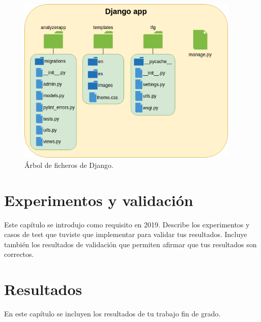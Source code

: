 \documentclass[a4paper, 12pt]{book}
\begin{document}
\begin{figure}
  \centering
  \includegraphics[height=8cm, keepaspectratio]{img/directorios.png}
  \caption{Árbol de ficheros de Django.}\label{fig:directorios}
\end{figure}




\cleardoublepage
\chapter{Experimentos y validación}

Este capítulo se introdujo como requisito en 2019. 
Describe los experimentos y casos de test que tuviste que implementar para validar tus resultados. 
Incluye también los resultados de validación que permiten afirmar que tus resultados son correctos. 



\cleardoublepage
\chapter{Resultados}

En este capítulo se incluyen los resultados de tu trabajo fin de grado.
\end{document}
